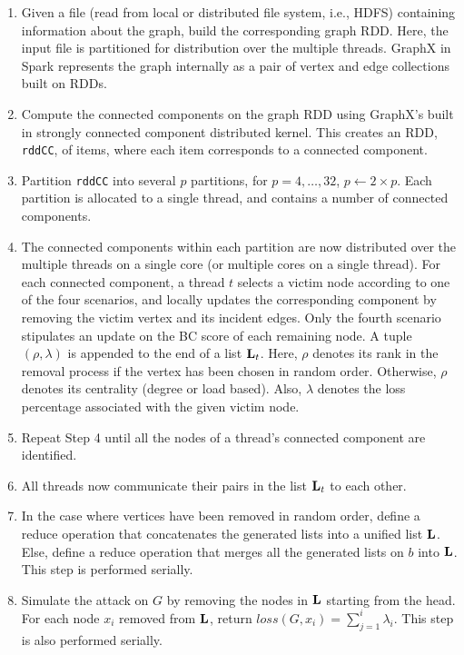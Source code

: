 \begin{enumerate}
\item Given a file (read from local or distributed file system, i.e., HDFS) containing information about the graph, build the corresponding graph RDD. Here, the input file is partitioned for distribution over the multiple threads. GraphX in Spark represents the graph internally as a pair of vertex and edge collections built on RDDs. 
\item Compute the connected components on the graph RDD using GraphX's built in strongly connected component distributed kernel. This creates an RDD, \texttt{rddCC}, of items, where each item corresponds to a connected component. 
\item Partition \texttt{rddCC} into several $p$ partitions, for $p = 4, \ldots, 32$, $p \leftarrow 2\times p$. Each partition is allocated to a single thread, and contains a number of connected components.  
\item The connected components within each partition are now distributed over the multiple threads on a single core (or multiple cores on a single thread). For each connected component, a thread $t$ selects a victim node according to one of the four scenarios, and locally updates the corresponding component by removing the victim vertex and its incident edges. Only the fourth scenario stipulates an update on the BC score of each remaining node. A tuple $(\rho,\lambda)$ is appended to the end of a list ${\bf L}_t$. Here, $\rho$ denotes its rank in the removal process if the vertex has been chosen in random order. Otherwise, $\rho$ denotes its centrality (degree or load based). Also, $\lambda$ denotes the loss percentage associated with the given victim node. 
\item Repeat Step 4 until all the nodes of a thread's connected component are identified. 
\item All threads now communicate their pairs in the list ${\bf L}_t$ to each other.
\item In the case where vertices have been removed in random order, define a reduce operation that concatenates the generated lists into a unified list ${\bf L}$. Else, define a reduce operation that merges all the generated lists on $b$ into ${\bf L}$. This step is performed serially.
\item Simulate the attack on $G$ by removing the nodes in ${\bf L}$ starting from the head. For each node $x_i$ removed from ${\bf L}$, return $loss(G,x_i) = \sum_{j = 1}^{i} \lambda_i$. This step is also performed serially.
\end{enumerate}
